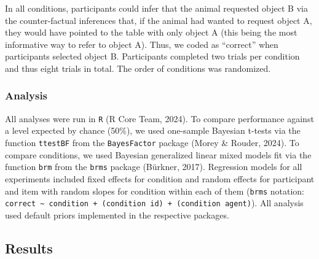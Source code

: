 \documentclass[
  man,floatsintext]{apa6}
\begin{document}
In all conditions, participants could infer that the animal requested object B via the counter-factual inferences that, if the animal had wanted to request object A, they would have pointed to the table with only object A (this being the most informative way to refer to object A). Thus, we coded as ``correct'' when participants selected object B. Participants completed two trials per condition and thus eight trials in total. The order of conditions was randomized.

\hypertarget{analysis}{%
\subsubsection{Analysis}\label{analysis}}

All analyses were run in \texttt{R} (R Core Team, 2024). To compare performance against a level expected by chance (50\%), we used one-sample Bayesian t-tests via the function \texttt{ttestBF} from the \texttt{BayesFactor} package (Morey \& Rouder, 2024). To compare conditions, we used Bayesian generalized linear mixed models fit via the function \texttt{brm} from the \texttt{brms} package (Bürkner, 2017). Regression models for all experiments included fixed effects for condition and random effects for participant and item with random slopes for condition within each of them (\texttt{brms} notation: \texttt{correct\ \textasciitilde{}\ condition\ +\ (condition\ \textbar{}id)\ +\ (condition\ \textbar{}agent)}). All analysis used default priors implemented in the respective packages.

\hypertarget{results}{%
\subsection{Results}\label{results}}
\end{document}
